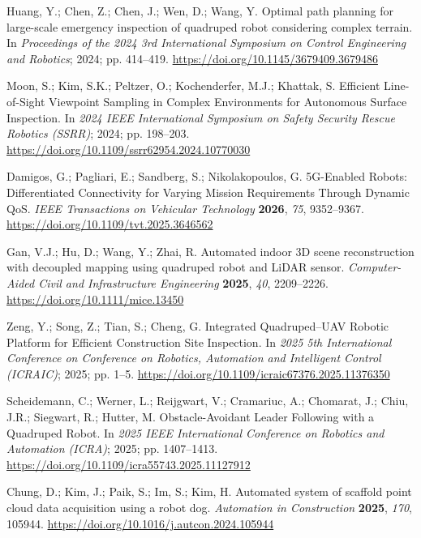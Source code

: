 Huang, Y.; Chen, Z.; Chen, J.; Wen, D.; Wang, Y. Optimal path planning for large-scale emergency inspection of quadruped robot considering complex terrain. In \emph{Proceedings of the 2024 3rd International Symposium on Control Engineering and Robotics}; 2024; pp. 414--419. \url{https://doi.org/10.1145/3679409.3679486}

Moon, S.; Kim, S.K.; Peltzer, O.; Kochenderfer, M.J.; Khattak, S. Efficient Line-of-Sight Viewpoint Sampling in Complex Environments for Autonomous Surface Inspection. In \emph{2024 IEEE International Symposium on Safety Security Rescue Robotics (SSRR)}; 2024; pp. 198--203. \url{https://doi.org/10.1109/ssrr62954.2024.10770030}

Damigos, G.; Pagliari, E.; Sandberg, S.; Nikolakopoulos, G. 5G-Enabled Robots: Differentiated Connectivity for Varying Mission Requirements Through Dynamic QoS. \emph{IEEE Transactions on Vehicular Technology} \textbf{2026}, \emph{75}, 9352--9367. \url{https://doi.org/10.1109/tvt.2025.3646562}

Gan, V.J.; Hu, D.; Wang, Y.; Zhai, R. Automated indoor 3D scene reconstruction with decoupled mapping using quadruped robot and LiDAR sensor. \emph{Computer-Aided Civil and Infrastructure Engineering} \textbf{2025}, \emph{40}, 2209--2226. \url{https://doi.org/10.1111/mice.13450}

Zeng, Y.; Song, Z.; Tian, S.; Cheng, G. Integrated Quadruped–UAV Robotic Platform for Efficient Construction Site Inspection. In \emph{2025 5th International Conference on Conference on Robotics, Automation and Intelligent Control (ICRAIC)}; 2025; pp. 1--5. \url{https://doi.org/10.1109/icraic67376.2025.11376350}

Scheidemann, C.; Werner, L.; Reijgwart, V.; Cramariuc, A.; Chomarat, J.; Chiu, J.R.; Siegwart, R.; Hutter, M. Obstacle-Avoidant Leader Following with a Quadruped Robot. In \emph{2025 IEEE International Conference on Robotics and Automation (ICRA)}; 2025; pp. 1407--1413. \url{https://doi.org/10.1109/icra55743.2025.11127912}

Chung, D.; Kim, J.; Paik, S.; Im, S.; Kim, H. Automated system of scaffold point cloud data acquisition using a robot dog. \emph{Automation in Construction} \textbf{2025}, \emph{170}, 105944. \url{https://doi.org/10.1016/j.autcon.2024.105944}

